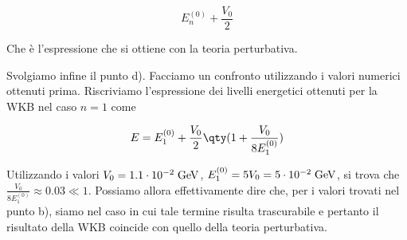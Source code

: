\begin{soluzione}
   \begin{equation*}
      E_n^{(0)} + \frac{V_0}{2}
   \end{equation*}

   Che è l'espressione che si ottiene con la teoria perturbativa.
   
   Svolgiamo infine il punto d). Facciamo un confronto utilizzando i valori numerici ottenuti prima. Riscriviamo l'espressione dei livelli energetici ottenuti per la WKB nel caso $n=1$ come
   
   \begin{equation*}
      E=E_1^{(0)} + \frac{V_0}{2} \qty( 1 + \frac{V_0}{8 E_1^{(0)}} )
   \end{equation*}

   Utilizzando i valori $V_0=1.1 \cdot 10^{-2} \; \rm GeV$, $E_1^{(0)}=5V_0=5 \cdot 10^{-2} \; \rm GeV$, si trova che $\frac{V_0}{8 E_1^{(0)}} \approx 0.03 \ll 1$. Possiamo allora effettivamente dire che, per i valori trovati nel punto b), siamo nel caso in cui tale termine risulta trascurabile e pertanto il risultato della WKB coincide con quello della teoria perturbativa.
\end{soluzione}

\newpage
\setcounter{equation}{0}

